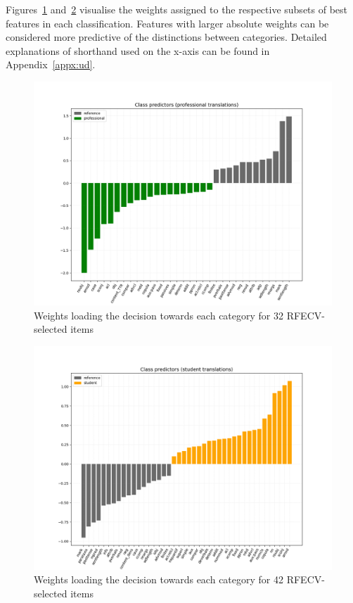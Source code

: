 Figures~\ref{fig:pro-weights} and~\ref{fig:stu-weights} visualise the weights assigned to the respective subsets of best features in each classification. Features with larger absolute weights can be considered more predictive of the distinctions between categories. 
Detailed explanations of shorthand used on the x-axis can be found in Appendix~\ref{appx:ud}.
\vspace{-2em}

\begin{figure}[H]
	\centering
	\includegraphics[width=.80\linewidth]{figures/pro-ref-bars-ud33}
	\caption{\label{fig:pro-weights}Weights loading the decision towards each category for 32 RFECV-selected items}	
\end{figure}
\vspace{-2em}

\begin{figure}[H]
	\centering
	\includegraphics[width=.80\linewidth]{figures/stu-ref-bars-ud42}
	\caption{\label{fig:stu-weights}Weights loading the decision towards each category for 42 RFECV-selected items}	
\end{figure}

